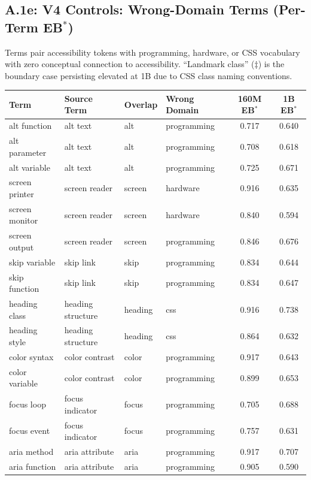 \documentclass[10pt]{article} %
\begin{document}
\subsection*{A.1e: V4 Controls: Wrong-Domain Terms (Per-Term EB$^*$)}\mbox{}
\label{sec:a1e_v4}

Terms pair accessibility tokens with programming, hardware, or CSS vocabulary with zero conceptual connection to accessibility.
``Landmark class'' ($\ddagger$) is the boundary case persisting elevated at 1B due to CSS class naming conventions.

\begin{table}[H]
\centering
\small
\begin{tabular}{|l|l|l|l|c|c|}
\hline
\textbf{Term} & \textbf{Source Term} & \textbf{Overlap} & \textbf{Wrong Domain} & \textbf{160M EB$^*$} & \textbf{1B EB$^*$} \\
\hline
alt function & alt text & alt & programming & 0.717 & 0.640 \\
alt parameter & alt text & alt & programming & 0.708 & 0.618 \\
alt variable & alt text & alt & programming & 0.725 & 0.671 \\
screen printer & screen reader & screen & hardware & 0.916 & 0.635 \\
screen monitor & screen reader & screen & hardware & 0.840 & 0.594 \\
screen output & screen reader & screen & programming & 0.846 & 0.676 \\
skip variable & skip link & skip & programming & 0.834 & 0.644 \\
skip function & skip link & skip & programming & 0.834 & 0.647 \\
heading class & heading structure & heading & css & 0.916 & 0.738 \\
heading style & heading structure & heading & css & 0.864 & 0.632 \\
color syntax & color contrast & color & programming & 0.917 & 0.643 \\
color variable & color contrast & color & programming & 0.899 & 0.653 \\
focus loop & focus indicator & focus & programming & 0.705 & 0.688 \\
focus event & focus indicator & focus & programming & 0.757 & 0.631 \\
aria method & aria attribute & aria & programming & 0.917 & 0.707 \\
aria function & aria attribute & aria & programming & 0.905 & 0.590 \\

\end{tabular}
\end{table}
\end{document}
